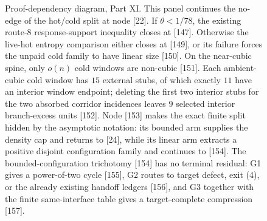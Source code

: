 \documentclass[11pt]{article}
\begin{document}
\begin{figure}[p]
{%
}
\caption[Proof-dependency diagram, Part XI]{Proof-dependency diagram, Part XI.  This panel continues the no-edge of the hot/cold split at node [22].  If \(\theta<1/78\), the existing route-8 response-support inequality closes at [147].  Otherwise the live-hot entropy comparison either closes at [149], or its failure forces the unpaid cold family to have linear size [150].  On the near-cubic spine, only \(o(n)\) cold windows are non-cubic [151].  Each ambient-cubic cold window has \(15\) external stubs, of which exactly \(11\) have an interior window endpoint; deleting the first two interior stubs for the two absorbed corridor incidences leaves \(9\) selected interior branch-excess units [152].  Node [153] makes the exact finite split hidden by the asymptotic notation: its bounded arm supplies the density cap and returns to [24], while its linear arm extracts a positive disjoint configuration family and continues to [154].  The bounded-configuration trichotomy [154] has no terminal residual: G1 gives a power-of-two cycle [155], G2 routes to target defect, exit \textup{(4)}, or the already existing handoff ledgers [156], and G3 together with the finite same-interface table gives a target-complete compression [157].}
\label{fig:proof-diagram-part-xi}
\end{figure}
\end{document}
